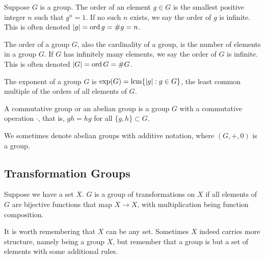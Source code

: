 \begin{definition}
    Suppose \(G\) is a group.
    The order of an element \(g \in G\)
    is the smallest positive integer \(n\)
    such that \(g^n = 1\).
    If no such \(n\) exists,
    we say the order of \(g\) is infinite.
    This is often denoted \(\abs{g} = \operatorname{ord}{g} = \#g = n\).
\end{definition}
\begin{definition}
    The order of a group \(G\),
    also the cardinality of a group,
    is the number of elements in a group \(G\).
    If \(G\) has infinitely many elements,
    we say the order of \(G\) is infinite.
    This is often denoted \(\abs{G} = \operatorname{ord}{G} = \#G\).
\end{definition}
\begin{definition}
    The exponent of a group \(G\)
    is \(\exp(G) = \operatorname{lcm}\{\abs{g}: g \in G\}\),
    the least common multiple of the orders of all elements of \(G\).
\end{definition}

\begin{definition}
    A commutative group or an abelian group
    is a group \(G\) with a commutative operation \(\cdot\),
    that is, \(gh = hg\) for all \(\{g,h\} \subset G\).
\end{definition}
\begin{remark}
    We sometimes denote abelian groups with additive notation,
    where \((G,+,0)\) is a group.
\end{remark}


\subsection{Transformation Groups}

\begin{definition}
    Suppose we have a set \(X\).
    \(G\) is a group of transformations on \(X\)
    if all elements of \(G\) are bijective functions that map \(X \to X\),
    with multiplication being function composition.
\end{definition}
\begin{remark}
    It is worth remembering that \(X\) can be any set.
    Sometimes \(X\) indeed carries more structure,
    namely being a group \(X\),
    but remember that a group is but a set of elements
    with some additional rules.
\end{remark}

